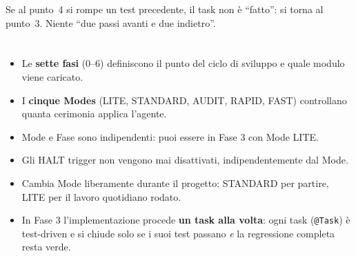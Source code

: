 Se al punto~4 si rompe un test precedente, il task non è ``fatto'': si torna al punto~3. Niente ``due passi avanti e due indietro''.

\section*{\LabelSummary}

\begin{itemize}
  \item Le \textbf{sette fasi} (0--6) definiscono il punto del ciclo di sviluppo e quale modulo viene caricato.
  \item I \textbf{cinque Modes} (LITE, STANDARD, AUDIT, RAPID, FAST) controllano quanta cerimonia applica l'agente.
  \item Mode e Fase sono indipendenti: puoi essere in Fase 3 con Mode LITE.
  \item Gli HALT trigger non vengono mai disattivati, indipendentemente dal Mode.
  \item Cambia Mode liberamente durante il progetto: STANDARD per partire, LITE per il lavoro quotidiano rodato.
  \item In Fase 3 l'implementazione procede \textbf{un task alla volta}: ogni task (\texttt{@Task}) è test-driven e si chiude solo se i suoi test passano \textit{e} la regressione completa resta verde.
\end{itemize}
